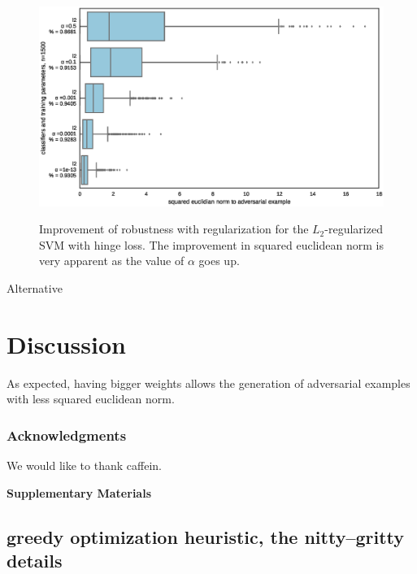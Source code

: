 \documentclass{article} %
\begin{document}
\begin{figure}[h!]
 \includegraphics[scale=0.5]{figs/experiment_2_l2}
 \label{res:exp2}
 \caption{\small Improvement of robustness with regularization for the $L_2$-regularized SVM with hinge loss. The improvement in squared euclidean norm is very apparent as the value of $\alpha$ goes up.}
\end{figure}

Alternative


\section{Discussion}

As expected, having bigger weights allows the generation of adversarial examples with less
squared euclidean norm.


\subsubsection*{Acknowledgments}
We would like to thank caffein.








\newpage


\begin{center}
\textbf{\large Supplementary Materials}
\end{center}

\subsection{greedy optimization heuristic, the nitty–gritty details}
\label{greedy:proof}
\end{document}

